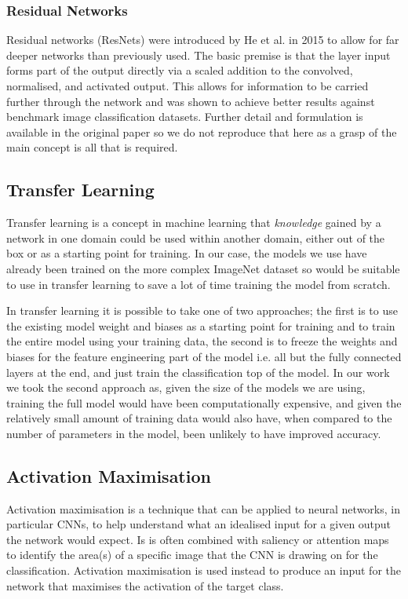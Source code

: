 \documentclass[12pt]{article}
\numberwithin{equation}{section}
\numberwithin{figure}{section}
\begin{document}
\subsubsection{Residual Networks}
Residual networks (ResNets) were introduced by He et al. in 2015\cite{He2015a} to allow for far deeper networks than previously used. The basic premise is that the layer input forms part of the output directly via a scaled addition to the convolved, normalised, and activated output. This allows for information to be carried further through the network and was shown to achieve better results against benchmark image classification datasets. Further detail and formulation is available in the original paper so we do not reproduce that here as a grasp of the main concept is all that is required.

\subsection{Transfer Learning} 
\label{sub:Transfer_Learning} 
Transfer learning is a concept in machine learning that \emph{knowledge} gained by a network in one domain could be used within another domain, either out of the box or as a starting point for training. In our case, the models we use have already been trained on the more complex ImageNet dataset so would be suitable to use in transfer learning to save a lot of time training the model from scratch.


In transfer learning it is possible to take one of two approaches; the first is to use the existing model weight and biases as a starting point for training and to train the entire model using your training data, the second is to freeze the weights and biases for the feature engineering part of the model i.e. all but the fully connected layers at the end, and just train the classification top of the model. In our work we took the second approach as, given the size of the models we are using, training the full model would have been computationally expensive, and given the relatively small amount of training data would also have, when compared to the number of parameters in the model, been unlikely to have improved accuracy.

\subsection{Activation Maximisation} 
\label{sub:Activation_Maximisation} 
Activation maximisation is a technique that can be applied to neural networks, in particular CNNs, to help understand what an idealised input for a given output the network would expect. Is is often combined with saliency or attention maps to identify the area(s) of a specific image that the CNN is drawing on for the classification. Activation maximisation is used instead to produce an input for the network that maximises the activation of the target class. 
\end{document}
